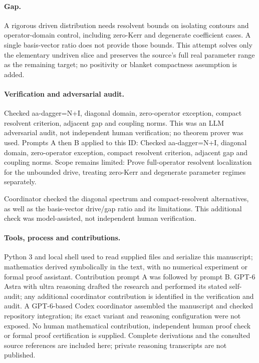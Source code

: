 \documentclass[11pt]{article}
\begin{document}
\paragraph{Gap.}A rigorous driven distribution needs resolvent bounds on isolating contours and operator-domain control, including zero-Kerr and degenerate coefficient cases. A single basis-vector ratio does not provide those bounds. This attempt solves only the elementary undriven slice and preserves the source's full real parameter range as the remaining target; no positivity or blanket compactness assumption is added.

\paragraph{Verification and adversarial audit.}
Checked aa-dagger=N+I, diagonal domain, zero-operator exception, compact resolvent criterion, adjacent gap and coupling norms. This was an LLM adversarial audit, not independent human verification; no theorem prover was used. Prompts A then B applied to this ID: Checked aa-dagger=N+I, diagonal domain, zero-operator exception, compact resolvent criterion, adjacent gap and coupling norms. Scope remains limited: Prove full-operator resolvent localization for the unbounded drive, treating zero-Kerr and degenerate parameter regimes separately.

Coordinator checked the diagonal spectrum and compact-resolvent alternatives, as well as the basis-vector drive/gap ratio and its limitations. This additional check was model-assisted, not independent human verification.

\paragraph{Tools, process and contributions.}
Python 3 and local shell used to read supplied files and serialize this manuscript; mathematics derived symbolically in the text, with no numerical experiment or formal proof assistant. Contribution prompt A was followed by prompt B. GPT-6 Astra with ultra reasoning drafted the research and performed its stated self-audit; any additional coordinator contribution is identified in the verification and audit. A GPT-6-based Codex coordinator assembled the manuscript and checked repository integration; its exact variant and reasoning configuration were not exposed. No human mathematical contribution, independent human proof check or formal proof certification is supplied. Complete derivations and the consulted source references are included here; private reasoning transcripts are not published.
\end{document}
